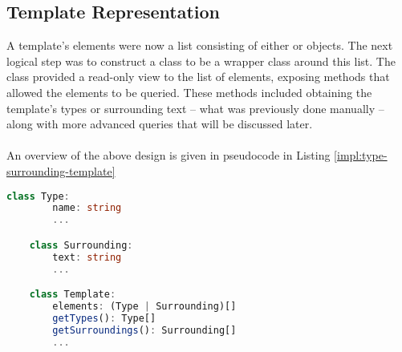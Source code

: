 \documentclass[../main.tex]{subfiles}
\begin{document}
\subsection{Template Representation}
A template's elements were now a list consisting of either  or  objects.
The next logical step was to construct a  class to be a wrapper class around this list. The  class provided a read-only view to the list of elements, exposing methods that allowed the elements to be queried. These methods included obtaining the template's types or surrounding text -- what was previously done manually -- along with more advanced queries that will be discussed later.
\\
\\
An overview of the above design is given in pseudocode in Listing \ref{impl:type-surrounding-template}
\begin{lstlisting}[language={TypeScript}, label={impl:type-surrounding-template}, caption={An overview of the \codeword{Type}, \codeword{Surrounding} and \codeword{Template} classes.}]
    class Type:
        name: string
        ...

    class Surrounding:
        text: string
        ...

    class Template:
        elements: (Type | Surrounding)[]
        getTypes(): Type[]
        getSurroundings(): Surrounding[]
        ...
\end{lstlisting}
\end{document}
